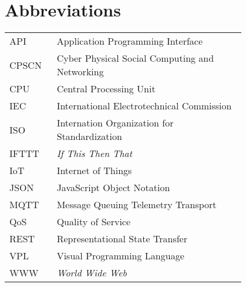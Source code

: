 \chapter*{Abbreviations}


\begin{flushleft}
\begin{tabular}{l p{0.8\linewidth}}
API      & Application Programming Interface\\
CPSCN    & Cyber Physical Social Computing and Networking\\
CPU      & Central Processing Unit\\
IEC      & International Electrotechnical Commission\\
ISO      & Internation Organization for Standardization\\
IFTTT    & \textit{If This Then That}\\
IoT      & Internet of Things\\
JSON     & JavaScript Object Notation\\
MQTT     & Message Queuing Telemetry Transport\\
QoS      & Quality of Service\\
REST     & Representational State Transfer\\
VPL      & Visual Programming Language\\
WWW      & \textit{World Wide Web}\\
\end{tabular}
\end{flushleft}

